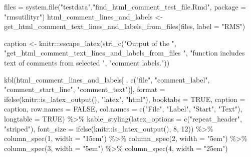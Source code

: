 \documentclass[
]{article}
\newenvironment{Shaded}{\begin{snugshade}}{\end{snugshade}}
\newcommand{\AttributeTok}[1]{\textcolor[rgb]{0.77,0.63,0.00}{#1}}
\newcommand{\ConstantTok}[1]{\textcolor[rgb]{0.00,0.00,0.00}{#1}}
\newcommand{\DecValTok}[1]{\textcolor[rgb]{0.00,0.00,0.81}{#1}}
\newcommand{\FunctionTok}[1]{\textcolor[rgb]{0.00,0.00,0.00}{#1}}
\newcommand{\NormalTok}[1]{#1}
\newcommand{\OtherTok}[1]{\textcolor[rgb]{0.56,0.35,0.01}{#1}}
\newcommand{\SpecialCharTok}[1]{\textcolor[rgb]{0.00,0.00,0.00}{#1}}
\newcommand{\StringTok}[1]{\textcolor[rgb]{0.31,0.60,0.02}{#1}}
\begin{document}
\begin{Shaded}
\begin{Highlighting}[]
\NormalTok{files }\OtherTok{=} \FunctionTok{system.file}\NormalTok{(}\StringTok{"testdata"}\NormalTok{,}\StringTok{"find\_html\_comment\_test\_file.Rmd"}\NormalTok{, }
                       \AttributeTok{package =} \StringTok{"rmsutilityr"}\NormalTok{)}
\NormalTok{html\_comment\_lines\_and\_labels }\OtherTok{\textless{}{-}} 
  \FunctionTok{get\_html\_comment\_text\_lines\_and\_labels\_from\_files}\NormalTok{(files, }\AttributeTok{label =} \StringTok{"RMS"}\NormalTok{)}

\NormalTok{caption }\OtherTok{\textless{}{-}} 
\NormalTok{  knitr}\SpecialCharTok{:::}\FunctionTok{escape\_latex}\NormalTok{(}\FunctionTok{stri\_c}\NormalTok{(}\StringTok{"Output of the "}\NormalTok{, }
         \StringTok{"get\_html\_comment\_text\_lines\_and\_labels\_from\_files "}\NormalTok{,}
         \StringTok{"function includes text of comments from selected "}\NormalTok{,}
         \StringTok{"comment labels."}\NormalTok{))}


 \FunctionTok{kbl}\NormalTok{(html\_comment\_lines\_and\_labels[ , }\FunctionTok{c}\NormalTok{(}\StringTok{"file"}\NormalTok{, }\StringTok{"comment\_label"}\NormalTok{,}
                                        \StringTok{"comment\_start\_line"}\NormalTok{,}
                                        \StringTok{"comment\_text"}\NormalTok{)],}
     \AttributeTok{format =} \FunctionTok{ifelse}\NormalTok{(knitr}\SpecialCharTok{::}\FunctionTok{is\_latex\_output}\NormalTok{(), }\StringTok{"latex"}\NormalTok{, }\StringTok{"html"}\NormalTok{),}
     \AttributeTok{booktabs =} \ConstantTok{TRUE}\NormalTok{, }\AttributeTok{caption =}\NormalTok{ caption,}
     \AttributeTok{row.names =} \ConstantTok{FALSE}\NormalTok{,}
     \AttributeTok{col.names =} \FunctionTok{c}\NormalTok{(}\StringTok{"File"}\NormalTok{, }\StringTok{"Label"}\NormalTok{, }\StringTok{"Start"}\NormalTok{, }\StringTok{"Text"}\NormalTok{),}
     \AttributeTok{longtable =} \ConstantTok{TRUE}\NormalTok{) }\SpecialCharTok{\%\textgreater{}\%} 
   \FunctionTok{kable\_styling}\NormalTok{(}\AttributeTok{latex\_options =} \FunctionTok{c}\NormalTok{(}\StringTok{"repeat\_header"}\NormalTok{, }\StringTok{"striped"}\NormalTok{), }
                 \AttributeTok{font\_size =} \FunctionTok{ifelse}\NormalTok{(knitr}\SpecialCharTok{::}\FunctionTok{is\_latex\_output}\NormalTok{(), }\DecValTok{8}\NormalTok{, }\DecValTok{12}\NormalTok{)) }\SpecialCharTok{\%\textgreater{}\%}
   \FunctionTok{column\_spec}\NormalTok{(}\DecValTok{1}\NormalTok{, }\AttributeTok{width =} \StringTok{"15em"}\NormalTok{) }\SpecialCharTok{\%\textgreater{}\%}
   \FunctionTok{column\_spec}\NormalTok{(}\DecValTok{2}\NormalTok{, }\AttributeTok{width =} \StringTok{"5em"}\NormalTok{) }\SpecialCharTok{\%\textgreater{}\%}
   \FunctionTok{column\_spec}\NormalTok{(}\DecValTok{3}\NormalTok{, }\AttributeTok{width =} \StringTok{"5em"}\NormalTok{) }\SpecialCharTok{\%\textgreater{}\%}
   \FunctionTok{column\_spec}\NormalTok{(}\DecValTok{4}\NormalTok{, }\AttributeTok{width =} \StringTok{"25em"}\NormalTok{) }
\end{Highlighting}
\end{Shaded}
\end{document}
